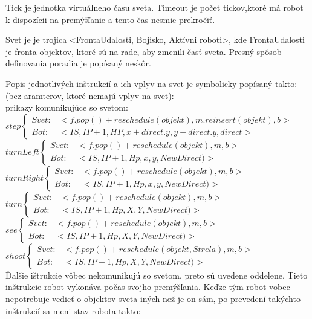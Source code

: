 \begin{definicia}
Tick je jednotka virtuálneho času sveta. Timeout je počet tickov,ktoré má robot k dispozícii na premýšľanie a tento čas nesmie prekročiť.
\end{definicia}

\begin{definicia} 
Svet je je trojica <FrontaUdalosti, Bojisko, Aktívni roboti>, kde FrontaUdalosti je fronta objektov, ktoré sú na rade, aby zmenili časť sveta. Presný spôsob definovania poradia je popísaný neskôr.
\end{definicia}
Popis jednotlivých inštrukcií a ich vplyv na svet je symbolicky popísaný takto: (bez aramterov, ktoré nemajú vplyv na svet):\\
prikazy komunikujúce so svetom:\\
$ step \left\{ \begin{array}{ll} Svet: & <f.pop()+reschedule(objekt),m.reinsert(objekt), b> \\ Bot: & < IS, IP + 1, HP, x+direct.y, y+ direct.y, direct> \end{array}\right.  $\\
$ turnLeft \left\{ \begin{array}{lc} Svet: & <f.pop()+reschedule(objekt),m, b> \\ Bot: & < IS, IP + 1, Hp, x, y, NewDirect)> \end{array}\right.  $\\
$ turnRight \left\{ \begin{array}{lc} Svet: & <f.pop()+reschedule(objekt),m, b> \\ Bot: & < IS, IP + 1, Hp, x, y, NewDirect)> \end{array}\right.  $\\
$turn  \left\{\begin{array}{lc} Svet: & <f.pop()+reschedule(objekt),m,b> \\ Bot: & <IS, IP+1, Hp, X, Y, NewDirect)> \end{array}\right. $\\
$see  \left\{\begin{array}{lc} Svet: & <f.pop()+reschedule(objekt),m,b> \\ Bot: & <IS, IP+1, Hp, X, Y, NewDirect)> \end{array}\right. $\\
$shoot \left\{\begin{array}{lc} Svet: & <f.pop()+reschedule(objekt,Strela),m,b> \\ Bot: & <IS, IP+1, Hp, X, Y, NewDirect)> \end{array}\right. $\\
\indent
Ďalšie ištrukcie vôbec nekomunikujú so svetom, preto sú uvedene oddelene. Tieto inštrukcie robot vykonáva počas svojho premýšľania. Keďze tým robot vobec nepotrebuje vedieť o objektov sveta iných než je on sám, po prevedení takýchto inštrukcií sa meni stav robota takto:\\


